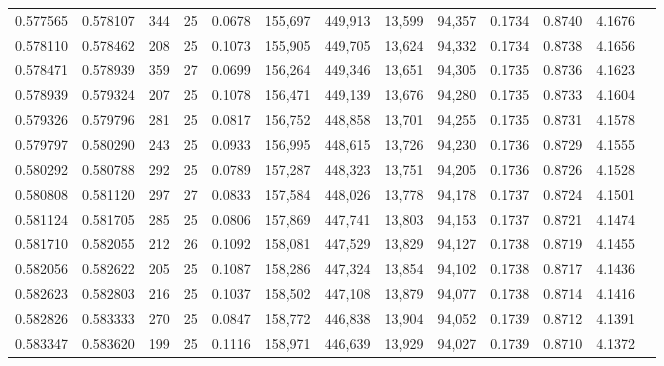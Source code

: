 \begin{tabular}{rrrrrrrrrrrrr}
0.577565 & 0.578107 &   344 &  25 &                                     0.0678 & 155,697 & 449,913 &  13,599 &  94,357 & 0.1734 & 0.8740 & 4.1676 \\
0.578110 & 0.578462 &   208 &  25 &                                     0.1073 & 155,905 & 449,705 &  13,624 &  94,332 & 0.1734 & 0.8738 & 4.1656 \\
0.578471 & 0.578939 &   359 &  27 &                                     0.0699 & 156,264 & 449,346 &  13,651 &  94,305 & 0.1735 & 0.8736 & 4.1623 \\
0.578939 & 0.579324 &   207 &  25 &                                     0.1078 & 156,471 & 449,139 &  13,676 &  94,280 & 0.1735 & 0.8733 & 4.1604 \\
0.579326 & 0.579796 &   281 &  25 &                                     0.0817 & 156,752 & 448,858 &  13,701 &  94,255 & 0.1735 & 0.8731 & 4.1578 \\
0.579797 & 0.580290 &   243 &  25 &                                     0.0933 & 156,995 & 448,615 &  13,726 &  94,230 & 0.1736 & 0.8729 & 4.1555 \\
0.580292 & 0.580788 &   292 &  25 &                                     0.0789 & 157,287 & 448,323 &  13,751 &  94,205 & 0.1736 & 0.8726 & 4.1528 \\
0.580808 & 0.581120 &   297 &  27 &                                     0.0833 & 157,584 & 448,026 &  13,778 &  94,178 & 0.1737 & 0.8724 & 4.1501 \\
0.581124 & 0.581705 &   285 &  25 &                                     0.0806 & 157,869 & 447,741 &  13,803 &  94,153 & 0.1737 & 0.8721 & 4.1474 \\
0.581710 & 0.582055 &   212 &  26 &                                     0.1092 & 158,081 & 447,529 &  13,829 &  94,127 & 0.1738 & 0.8719 & 4.1455 \\
0.582056 & 0.582622 &   205 &  25 &                                     0.1087 & 158,286 & 447,324 &  13,854 &  94,102 & 0.1738 & 0.8717 & 4.1436 \\
0.582623 & 0.582803 &   216 &  25 &                                     0.1037 & 158,502 & 447,108 &  13,879 &  94,077 & 0.1738 & 0.8714 & 4.1416 \\
0.582826 & 0.583333 &   270 &  25 &                                     0.0847 & 158,772 & 446,838 &  13,904 &  94,052 & 0.1739 & 0.8712 & 4.1391 \\
0.583347 & 0.583620 &   199 &  25 &                                     0.1116 & 158,971 & 446,639 &  13,929 &  94,027 & 0.1739 & 0.8710 & 4.1372 \\

\end{tabular}
